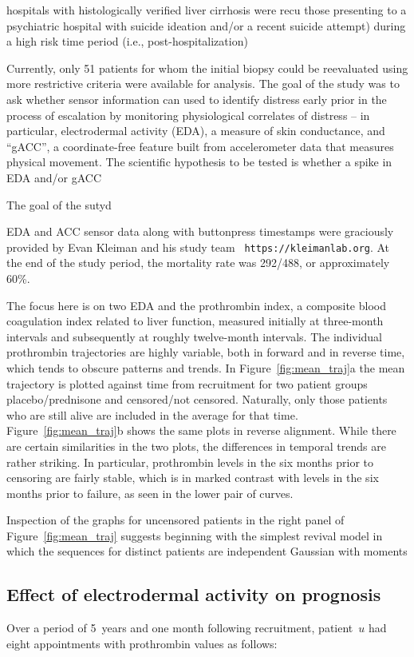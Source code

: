 \documentclass[11pt]{amsart}
\begin{document}
hospitals with histologically verified liver cirrhosis were recu
those presenting to a psychiatric hospital with suicide ideation
and/or a recent suicide attempt) during a high risk time period (i.e.,
post-hospitalization)

Currently, only 51 patients for whom the initial biopsy could be
reevaluated using more restrictive criteria were available for
analysis.
The goal of the study was to ask whether sensor information can used
to identify distress early prior in the process of escalation by
monitoring physiological correlates of distress -- in particular,
electrodermal activity (EDA), a measure of skin conductance, and
``gACC'', a coordinate-free feature built from accelerometer data
that measures physical movement.
The scientific hypothesis to be tested is whether a spike in
EDA and/or gACC

The goal of the sutyd



EDA and ACC sensor data along with buttonpress timestamps were
graciously provided by Evan Kleiman and his study team {\tt
https://kleimanlab.org}.
At the end of the study period, the mortality rate was 292/488, or
approximately 60\%.

The focus here is on two EDA and the  prothrombin index, a composite
blood coagulation index
related to liver function, measured initially at three-month intervals
and subsequently at roughly twelve-month intervals.
The individual prothrombin trajectories are highly variable,
both in forward and in reverse time,
which tends to obscure patterns and trends.
In Figure~\ref{fig:mean_traj}a the mean trajectory is plotted against time from recruitment
for two patient groups placebo/prednisone and censored/not censored.
Naturally, only those patients who are still alive are included in the average
for that time.
Figure~\ref{fig:mean_traj}b shows the same plots in reverse alignment.
While there are certain similarities in the two plots,
the differences in temporal trends are rather striking.
In particular, prothrombin levels in the six months prior to censoring are fairly stable,
which is in marked contrast with levels in the six months prior to failure,
as seen in the lower pair of curves.

Inspection of the graphs for uncensored patients in the right panel of Figure~\ref{fig:mean_traj} suggests
beginning with the simplest revival model in which the sequences
for distinct patients are independent Gaussian with moments


\subsection{Effect of electrodermal activity on prognosis}
Over a period of 5~years and one month following recruitment,
patient~$u$ had eight appointments with prothrombin values as follows:
\end{document}
